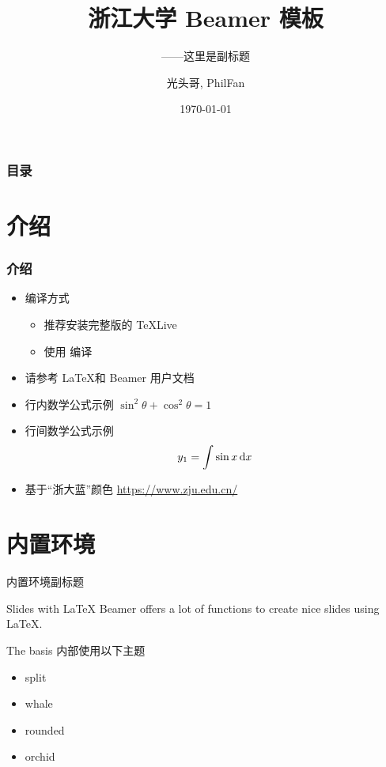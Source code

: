 \documentclass[10pt,aspectratio=169]{beamer}
\title[浙江大学 Beamer 模板]{浙江大学 Beamer 模板}
\subtitle{——这里是副标题}
\author[Guang Touge, PhilFan]{光头哥, PhilFan}
\institute[IOPP]{计算机学院 \\ 浙江大学}
\date{\today}
\begin{document}
\begin{frame}
	\titlepage
\end{frame}				%

\begin{frame}
	\frametitle{目录}
	\tableofcontents
\end{frame}				%

\section{介绍}
\begin{frame}
	\frametitle{介绍}

	\begin{itemize}
		\item {编译方式}
		      \begin{itemize}
			      \item  推荐安装完整版的 TeXLive
			      \item 使用 \XeLaTeX 编译
		      \end{itemize}
		\item 请参考 \LaTeX 和 Beamer 用户文档

		\item 行内数学公式示例 $\sin^2 \theta + \cos^2 \theta = 1$
		\item {行间数学公式示例 \begin{equation}
			      y_{1}=\int \sin x\, {\rm d}x
		      \end{equation}	 }
		\item 基于“浙大蓝”颜色 \url{https://www.zju.edu.cn/}
	\end{itemize}
\end{frame}

\section{内置环境}
\begin{frame}{内置环境}{副标题}
	\begin{block}{Slides with \LaTeX}
		Beamer offers a lot of functions to create nice slides using \LaTeX.
	\end{block}

	\begin{block}{The basis}
		内部使用以下主题
		\begin{itemize}
			\item split
			\item whale
			\item rounded
			\item orchid
		\end{itemize}
	\end{block}
\end{frame}
\end{document}
